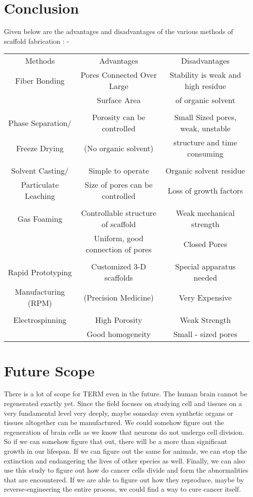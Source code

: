 \documentclass[12pt]{article}
\begin{document}
\centering
\section{Conclusion}
\bigskip
\raggedright
Given below are the advantages and disadvantages of the various methods of scaffold fabrication : -
\linebreak
\linebreak
\begin{tabular}{|c|c|c|}
\hline
Methods & Advantages & Disadvantages\\
Fiber Bonding & Pores Connected Over Large & Stability is weak and high residue \\
&   Surface Area & of organic solvent\\
 & & \\
Phase Separation/ & Porosity can be controlled & Small Sized pores, weak, unstable\\
Freeze Drying & (No organic solvent) & structure and time consuming\\
& & \\
Solvent Casting/ & Simple to operate & Organic solvent residue\\
Particulate Leaching & Size of pores can be controlled & Loss of growth factors\\
& & \\
Gas Foaming & Controllable structure of scaffold & Weak mechanical strength\\
& Uniform, good connection of pores & Closed Pores\\
& & \\
Rapid Prototyping & Customized 3-D scaffolds & Special apparatus needed\\
Manufacturing (RPM) & (Precision Medicine) & Very Expensive\\
& & \\
Electrospinning & High Porosity & Weak Strength \\
 & Good homogeneity & Small - sized pores \\
 \hline
\end{tabular}
\clearpage

\centering
\section{Future Scope}
\raggedright
There is a lot of scope for TERM even in the future. The human brain cannot be regenerated exactly yet. Since the field focuses on studying cell and tissues on a very fundamental level very deeply, maybe someday even synthetic organs or tissues altogether can be manufactured. We could somehow figure out the regeneration of brain cells as we know that neurons do not undergo cell division. So if we can somehow figure that out, there will be a more than significant growth in our lifespan. If we can figure out the same for animals, we can stop the extinction and endangering the lives of other species as well. Finally, we can also use this study to figure out how do cancer cells divide and form the abnormalities that are encountered. If we are able to figure out how they reproduce, maybe by reverse-engineering the entire process, we could find a way to cure cancer itself.
\linebreak
\end{document}
